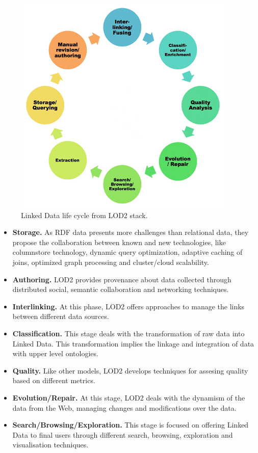 \begin{figure}
    \center
    \includegraphics[scale=0.6]{img/data_lifecycle/lod2lifecyle1.png}
    \caption{Linked Data life cycle from LOD2 stack.}
    \label{fig:lod2}
\end{figure}

\begin{itemize}
    \item \textbf{Storage.} As RDF data presents more challenges than relational data, they propose the collaboration between known and new technologies, like columnstore technology, dynamic query optimization, adaptive caching of joins, optimized graph processing and cluster/cloud scalability.

    \item \textbf{Authoring.} LOD2 provides provenance about data collected through distributed social, semantic collaboration and networking techniques.

    \item \textbf{Interlinking.} At this phase, LOD2 offers approaches to manage the links between different data sources.

    \item \textbf{Classification.} This stage deals with the transformation of raw data into Linked Data. This transformation implies the linkage and integration of data with upper level ontologies.

    \item \textbf{Quality.} Like other models, LOD2 develops techniques for assesing quality based on different metrics.

    \item \textbf{Evolution/Repair.} At this stage, LOD2 deals with the dynamism of the data from the Web, managing changes and modifications over the data.

    \item \textbf{Search/Browsing/Exploration.} This stage is focused on offering Linked Data to final users through different search, browsing, exploration and visualisation techniques.
\end{itemize}

